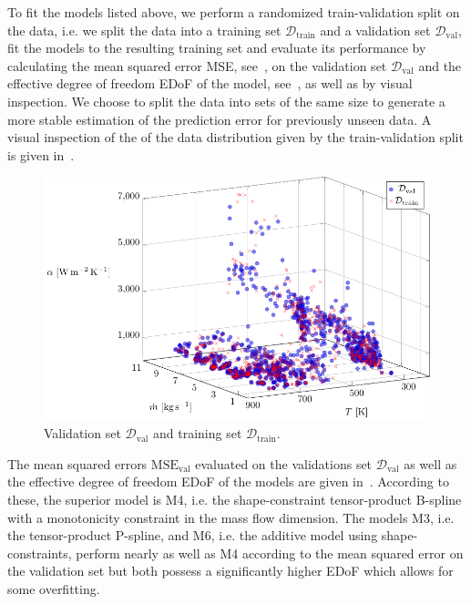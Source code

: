 To fit the models listed above, we perform a randomized train-validation split on the data, i.e. we split the data into a training set $\mathcal{D}_{\text{train}}$ and a validation set $\mathcal{D}_{\text{val}}$, fit the models to the resulting training set and evaluate its performance by calculating the mean squared error MSE, see~, on the validation set $\mathcal{D}_{\text{val}}$ and the effective degree of freedom EDoF of the model, see~, as well as by visual inspection. We choose to split the data into sets of the same size to generate a more stable estimation of the prediction error for previously unseen data. A visual inspection of the of the data distribution given by the train-validation split is given in~.

\begin{figure}[H]
	\centering
	\includegraphics[width=\columnwidth]{graphics/pgfplots/cha5/Ebner/train-val-split.pdf}
	\caption{Validation set $\mathcal{D}_{\text{val}}$ and training set $\mathcal{D}_{\text{train}}$.}
	\label{fig:ebner-train-val-split}
\end{figure}
%

The mean squared errors $\mathrm{MSE}_{\mathrm{val}}$ evaluated on the validations set $\mathcal{D}_{\text{val}}$ as well as the effective degree of freedom EDoF of the models are given in~. According to these, the superior model is M4, i.e. the shape-constraint tensor-product B-spline with a monotonicity constraint in the mass flow dimension. The models M3, i.e. the tensor-product P-spline, and M6, i.e. the additive model using shape-constraints, perform nearly as well as M4 according to the mean squared error on the validation set but both possess a significantly higher EDoF which allows for some overfitting. 

